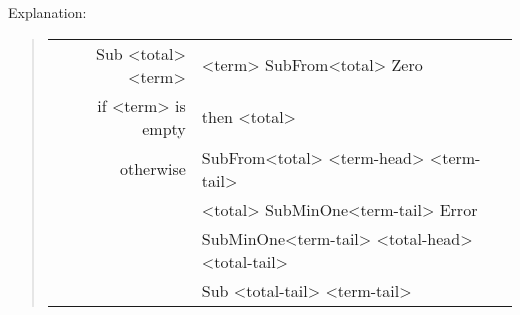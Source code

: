 \begin{inputwithcode}
\def\Sub#1#2{#1{\SubFrom{#2}}{#2}}
\def\SubFrom#1#2#3{#1{\SubMinOne{#3}}\Error}
\def\SubMinOne#1#2#3{\Sub{#1}{#3}}
\end{inputwithcode}
Explanation:
\begin{quote}\begin{ttfamily}\begin{tabular}{r@{$\Rightarrow$}l}
Sub <total> <term> & <term> SubFrom{<total>} Zero\\
if <term> is empty & then <total>\\
otherwise &SubFrom<total> <term-head> <term-tail>\\
&<total> SubMinOne<term-tail> Error\\
&SubMinOne<term-tail> <total-head> <total-tail>\\
&Sub <total-tail> <term-tail>
\end{tabular}\end{ttfamily}\end{quote}
